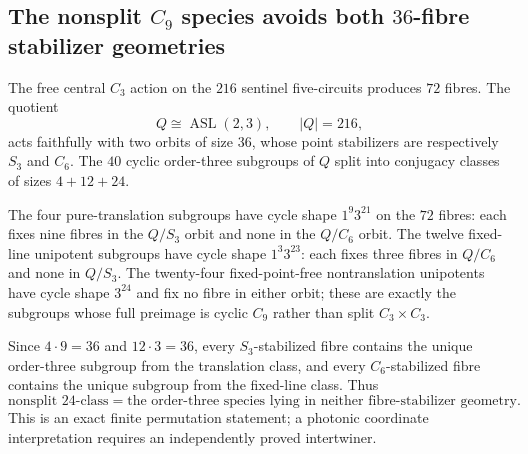 \subsection{The nonsplit $C_9$ species avoids both $36$-fibre stabilizer geometries}
The free central $C_3$ action on the $216$ sentinel five-circuits produces $72$ fibres.  The quotient
\[
Q\cong\operatorname{ASL}(2,3),\qquad |Q|=216,
\]
acts faithfully with two orbits of size $36$, whose point stabilizers are respectively $S_3$ and $C_6$.  The $40$ cyclic order-three subgroups of $Q$ split into conjugacy classes of sizes $4+12+24$.

The four pure-translation subgroups have cycle shape $1^9 3^{21}$ on the $72$ fibres: each fixes nine fibres in the $Q/S_3$ orbit and none in the $Q/C_6$ orbit.  The twelve fixed-line unipotent subgroups have cycle shape $1^3 3^{23}$: each fixes three fibres in $Q/C_6$ and none in $Q/S_3$.  The twenty-four fixed-point-free nontranslation unipotents have cycle shape $3^{24}$ and fix no fibre in either orbit; these are exactly the subgroups whose full preimage is cyclic $C_9$ rather than split $C_3\times C_3$.

Since $4\cdot9=36$ and $12\cdot3=36$, every $S_3$-stabilized fibre contains the unique order-three subgroup from the translation class, and every $C_6$-stabilized fibre contains the unique subgroup from the fixed-line class.  Thus
\[
\boxed{\text{nonsplit }24\text{-class}=\text{the order-three species lying in neither fibre-stabilizer geometry}.}
\]
This is an exact finite permutation statement; a photonic coordinate interpretation requires an independently proved intertwiner.
